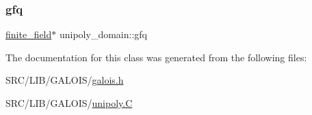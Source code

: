 \mbox{\label{classunipoly__domain_a365f2b14c8163f46577c19660672f7d5}} 
\subsubsection{\texorpdfstring{gfq}{gfq}}
{\footnotesize\ttfamily \mbox{\hyperlink{classfinite__field}{finite\+\_\+field}}$\ast$ unipoly\+\_\+domain\+::gfq}



The documentation for this class was generated from the following files\+:\begin{DoxyCompactItemize}
\item 
S\+R\+C/\+L\+I\+B/\+G\+A\+L\+O\+I\+S/\mbox{\hyperlink{galois_8h}{galois.\+h}}\item 
S\+R\+C/\+L\+I\+B/\+G\+A\+L\+O\+I\+S/\mbox{\hyperlink{_g_a_l_o_i_s_2unipoly_8_c}{unipoly.\+C}}\end{DoxyCompactItemize}
